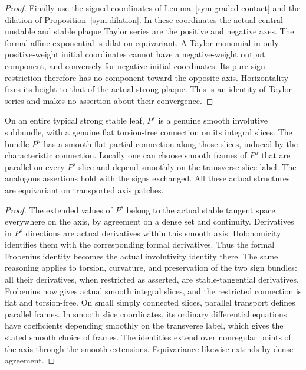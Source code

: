 \begin{proof}
Finally use the signed coordinates of
Lemma~\ref{sym:graded-contact} and the dilation of
Proposition~\ref{sym:dilation}. In these coordinates the actual central
unstable and stable plaque Taylor series are the positive and
negative axes. The formal affine exponential is dilation-equivariant.
A Taylor monomial in only positive-weight initial coordinates cannot
have a negative-weight output component, and conversely for negative
initial coordinates. Its pure-sign restriction therefore has no
component toward the opposite axis. Horizontality fixes its height
to that of the actual strong plaque. This is an identity of Taylor
series and makes no assertion about their convergence.
\end{proof}

\begin{lemma}\label{real:stable-restriction}
On an entire typical strong stable leaf, $P^s$ is a genuine smooth
involutive subbundle, with a genuine flat torsion-free connection on
its integral slices. The bundle $P^u$ has a smooth flat partial
connection along those slices, induced by the characteristic
connection. Locally one can choose smooth frames of $P^u$ that are
parallel on every $P^s$ slice and depend smoothly on the transverse
slice label. The analogous assertions hold with the signs exchanged.
All these actual structures are equivariant on transported axis
patches.
\end{lemma}

\begin{proof}
The extended values of $P^s$ belong to the actual stable tangent
space everywhere on the axis, by agreement on a dense set and
continuity. Derivatives in $P^s$ directions are actual derivatives
within this smooth axis. Holonomicity identifies them with the
corresponding formal derivatives. Thus the formal Frobenius identity
becomes the actual involutivity identity there. The same reasoning
applies to torsion, curvature, and preservation of the two sign
bundles: all their derivatives, when restricted as asserted, are
stable-tangential derivatives. Frobenius now gives actual smooth
integral slices, and the restricted connection is flat and
torsion-free. On small simply connected slices, parallel transport
defines parallel frames. In smooth slice coordinates, its ordinary
differential equations have coefficients depending smoothly on the
transverse label, which gives the stated smooth choice of frames.
The identities extend over nonregular points of the axis through
the smooth extensions. Equivariance likewise extends by dense
agreement.
\end{proof}

